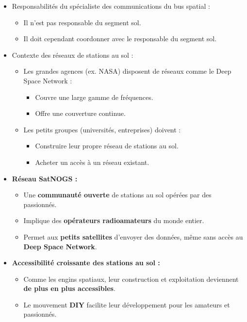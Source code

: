 \begin{itemize}[noitemsep, nolistsep]
    \item Responsabilités du spécialiste des communications du bus spatial :
    \begin{itemize}
        \item Il n'est pas responsable du segment sol.
        \item Il doit cependant coordonner avec le responsable du segment sol.
    \end{itemize}
     \item Contexte des réseaux de stations au sol :
    \begin{itemize}
        \item Les grandes agences (ex. NASA) disposent de réseaux comme le Deep Space Network :
        \begin{itemize}
            \item Couvre une large gamme de fréquences.
            \item Offre une couverture continue.
        \end{itemize}
        \item Les petits groupes (universités, entreprises) doivent :
        \begin{itemize}
            \item Construire leur propre réseau de stations au sol.
            \item Acheter un accès à un réseau existant.
        \end{itemize}
    \end{itemize}
    \item \textbf{Réseau SatNOGS :}
    \begin{itemize}
        \item Une \textbf{communauté ouverte} de stations au sol opérées par des passionnés.
        \item Implique des \textbf{opérateurs radioamateurs} du monde entier.
        \item Permet aux \textbf{petits satellites} d’envoyer des données, même sans accès au \textbf{Deep Space Network}.
    \end{itemize}
    \item \textbf{Accessibilité croissante des stations au sol :}
    \begin{itemize}
        \item Comme les engins spatiaux, leur construction et exploitation deviennent \textbf{de plus en plus accessibles}.
        \item Le mouvement \textbf{DIY} facilite leur développement pour les amateurs et passionnés.
    \end{itemize}
\end{itemize}
